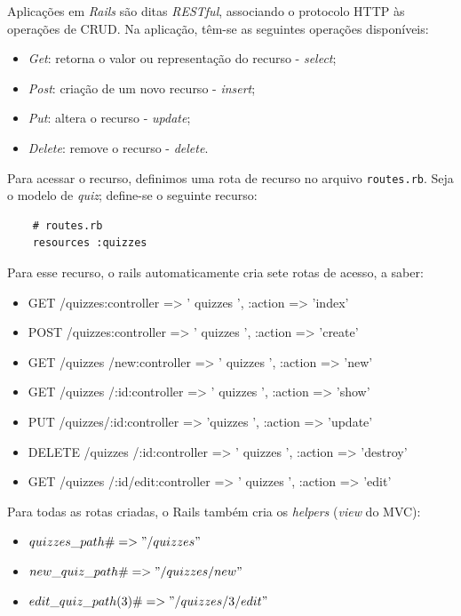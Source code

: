             Aplicações em \emph{Rails} são ditas \emph{RESTful}, associando o protocolo \ac{HTTP} às operações de \ac{CRUD}. Na aplicação, têm-se as seguintes operações disponíveis:
\begin{itemize}
\item \emph{Get}: retorna o valor ou representação do recurso - \emph{select};
\item \emph{Post}: criação de um novo recurso - \emph{insert};
\item \emph{Put}: altera o recurso - \emph{update};
\item \emph{Delete}: remove o recurso - \emph{delete}.
\end{itemize}     
    Para acessar o recurso, definimos uma rota de recurso no arquivo \texttt{routes.rb}. Seja o modelo de \emph{quiz}; define-se o seguinte recurso:
\begin{lstlisting}
    # routes.rb
    resources :quizzes
 \end{lstlisting}      
    Para esse recurso, o rails automaticamente cria sete rotas de acesso, a saber:
\begin{itemize}
\item GET /quizzes:controller => ' quizzes ', :action => 'index'
\item POST /quizzes:controller => ' quizzes ', :action => 'create'
\item GET /quizzes /new:controller => ' quizzes ', :action => 'new'
\item GET /quizzes /:id:controller => ' quizzes ', :action => 'show'
\item PUT /quizzes/:id:controller => 'quizzes ', :action => 'update'
\item DELETE /quizzes /:id:controller => ' quizzes ', :action => 'destroy'
\item GET /quizzes /:id/edit:controller => ' quizzes ', :action => 'edit'
\end{itemize}     

    Para todas as rotas criadas, o Rails também cria os \emph{helpers} (\emph{view} do \ac{MVC}):
	
\begin{itemize}
\item    $quizzes\_path         \# => "/quizzes "$
\item    $new\_quiz\_path      \# => "/quizzes /new"$
\item    $edit\_quiz\_path(3)  \# => "/quizzes /3/edit"$
\end{itemize}     
     
